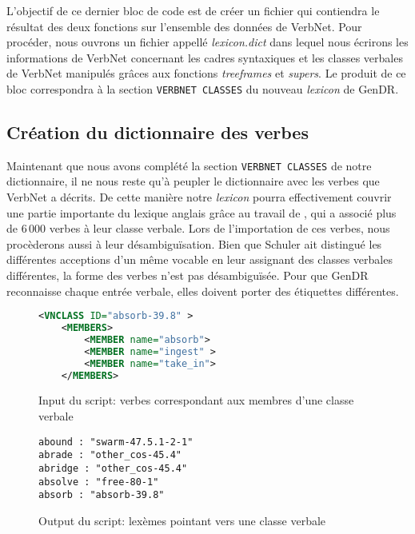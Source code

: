 L'objectif de ce dernier bloc de code est de créer un fichier qui contiendra le résultat des deux fonctions sur l'ensemble des données de VerbNet. Pour procéder, nous ouvrons un fichier appellé \emph{lexicon.dict} dans lequel nous écrirons les informations de VerbNet concernant les cadres syntaxiques et les classes verbales de VerbNet manipulés grâces aux fonctions \emph{treeframes} et \emph{supers}. Le produit de ce bloc correspondra à la section \texttt{VERBNET CLASSES} du nouveau \emph{lexicon} de GenDR.


\subsection{Création du dictionnaire des verbes} \label{extracmembre}

Maintenant que nous avons complété la section \texttt{VERBNET CLASSES} de notre dictionnaire, il ne nous reste qu'à peupler le dictionnaire avec les verbes que VerbNet a décrits. De cette manière notre \emph{lexicon} pourra effectivement couvrir une partie importante du lexique anglais grâce au travail de \cite{SchulerVerbnetBroadcoverageComprehensive2005}, qui a associé plus de 6\,000 verbes à leur classe verbale. Lors de l'importation de ces verbes, nous procèderons aussi à leur désambiguïsation. Bien que Schuler ait distingué les différentes acceptions d'un même vocable en leur assignant des classes verbales différentes, la forme des verbes n'est pas désambiguïsée. Pour que GenDR reconnaisse chaque entrée verbale, elles doivent porter des étiquettes différentes.

\begin{figure}[htb]
  \caption{Input du script: verbes correspondant aux membres d'une classe verbale}
	\label{fig:member-absorb}
\begin{lstlisting}[language=XML]
<VNCLASS ID="absorb-39.8" >
    <MEMBERS>
        <MEMBER name="absorb">
        <MEMBER name="ingest" >
        <MEMBER name="take_in">
    </MEMBERS>
\end{lstlisting}
\end{figure}

\begin{figure}[htb]
  \caption{Output du script: lexèmes pointant vers une classe verbale}
	\label{fig:member-output-absorb}
\begin{lstlisting}[language=mate]
abound : "swarm-47.5.1-2-1"
abrade : "other_cos-45.4"
abridge : "other_cos-45.4"
absolve : "free-80-1"
absorb : "absorb-39.8"
\end{lstlisting}
\end{figure}

